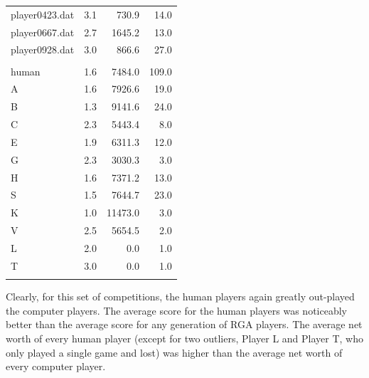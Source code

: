 \begin{table}[htbp]
\begin{tabular}{r|rrr}
    \multicolumn{1}{l|}{player0423.dat} & 3.1    & 730.9  & 14.0 \\
    \multicolumn{1}{l|}{player0667.dat} & 2.7    & 1645.2 & 13.0 \\
    \multicolumn{1}{l|}{player0928.dat} & 3.0    & 866.6  & 27.0 \\ \\
    \multicolumn{1}{l|}{human} & 1.6    & 7484.0 & 109.0 \\
    \hline
    \multicolumn{1}{l|}{A} & 1.6    & 7926.6 & 19.0 \\
    \multicolumn{1}{l|}{B} & 1.3    & 9141.6 & 24.0 \\
    \multicolumn{1}{l|}{C} & 2.3    & 5443.4 & 8.0 \\
    \multicolumn{1}{l|}{E} & 1.9    & 6311.3 & 12.0 \\
    \multicolumn{1}{l|}{G} & 2.3    & 3030.3 & 3.0 \\
    \multicolumn{1}{l|}{H} & 1.6    & 7371.2 & 13.0 \\
    \multicolumn{1}{l|}{S} & 1.5    & 7644.7 & 23.0 \\
    \multicolumn{1}{l|}{K} & 1.0    & 11473.0 & 3.0 \\
    \multicolumn{1}{l|}{V} & 2.5    & 5654.5 & 2.0 \\
    \multicolumn{1}{l|}{L} & 2.0    & 0.0    & 1.0 \\
    \multicolumn{1}{l|}{T} & 3.0    & 0.0    & 1.0 \\ \\
    \bottomrule
    \end{tabular}%
  \label{tab:human_rga_2}%
\end{table}%

Clearly, for this set of competitions, the human players again greatly
out-played the computer players. The average score for the human players was
noticeably better than the average score for any generation of RGA players. The
average net worth of every human player (except for two outliers, Player L and
Player T, who only played a single game and lost) was higher than the average
net worth of every computer player.

